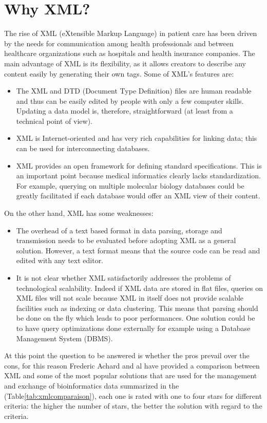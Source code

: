 \section{Why XML?}
The rise of XML (eXtensible Markup Language) in patient care has been driven by the needs for communication among health professionals and between healthcare organizations such as hospitals and health insurance companies. The main advantage of XML is its flexibility, as it allows creators to describe any content easily by generating their own tags\cite{thuy2012s}. Some of XML’s features are\cite{achard2001xml}:
\begin{itemize}
\renewcommand{\labelitemi}{$\bullet$}
\item The XML and DTD (Document Type Definition) files are human readable and thus can be easily edited by people with only a few computer skills. Updating a data model is, therefore, straightforward (at least from a technical point of view).
\item XML is Internet-oriented and has very rich capabilities for linking data; this can be used for interconnecting databases.
\item XML provides an open framework for defining standard specifications. This is an important point because medical informatics clearly lacks standardization. For example, querying on multiple molecular biology databases could be greatly facilitated if each database would offer an XML view of their content.
\end{itemize}
On the other hand, XML has some weaknesses:
\begin{itemize}
\renewcommand{\labelitemi}{$\bullet$}
\item The overhead of a text based format in data parsing, storage and transmission needs to be evaluated before adopting XML as a general solution. However, a text format means that the source code can be read and edited with any text editor.
\item It is not clear whether XML satisfactorily addresses the problems of technological scalability. Indeed if XML data are stored in flat files, queries on XML files will not scale because XML in itself does not provide scalable facilities such as indexing or data clustering. This means that parsing should be done on the fly which leads to poor performances. One solution could be to have query optimizations done externally for example using a Database Management System (DBMS).
\end{itemize}
\bigbreak
At this point the question to be answered is whether the pros prevail over the cons, for this reason Frederic Achard and al\cite{achard2001xml}  have provided a comparison between XML and some of the most popular solutions that are used for the management and exchange of bioinformatics data summarized in the (Table\ref{tab:xmlcomparaison}), each one is rated with one to four stars for different criteria: the higher the number of stars, the better the solution with regard to the criteria.
